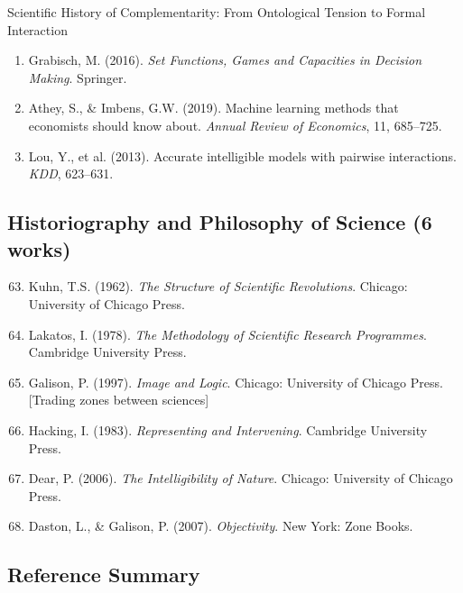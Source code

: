 \begin{chapter}{Scientific History of Complementarity: From Ontological Tension to Formal Interaction}
\begin{enumerate}
    \item Grabisch, M. (2016). \textit{Set Functions, Games and Capacities in Decision Making}. Springer.

    \item Athey, S., \& Imbens, G.W. (2019). Machine learning methods that economists should know about. \textit{Annual Review of Economics}, 11, 685--725.

    \item Lou, Y., et al. (2013). Accurate intelligible models with pairwise interactions. \textit{KDD}, 623--631.
\end{enumerate}

\subsection{Historiography and Philosophy of Science (6 works)}

\begin{enumerate}
    \setcounter{enumi}{62}
    \item Kuhn, T.S. (1962). \textit{The Structure of Scientific Revolutions}. Chicago: University of Chicago Press.

    \item Lakatos, I. (1978). \textit{The Methodology of Scientific Research Programmes}. Cambridge University Press.

    \item Galison, P. (1997). \textit{Image and Logic}. Chicago: University of Chicago Press. [Trading zones between sciences]

    \item Hacking, I. (1983). \textit{Representing and Intervening}. Cambridge University Press.

    \item Dear, P. (2006). \textit{The Intelligibility of Nature}. Chicago: University of Chicago Press.

    \item Daston, L., \& Galison, P. (2007). \textit{Objectivity}. New York: Zone Books.
\end{enumerate}

\subsection{Reference Summary}


\end{chapter}

